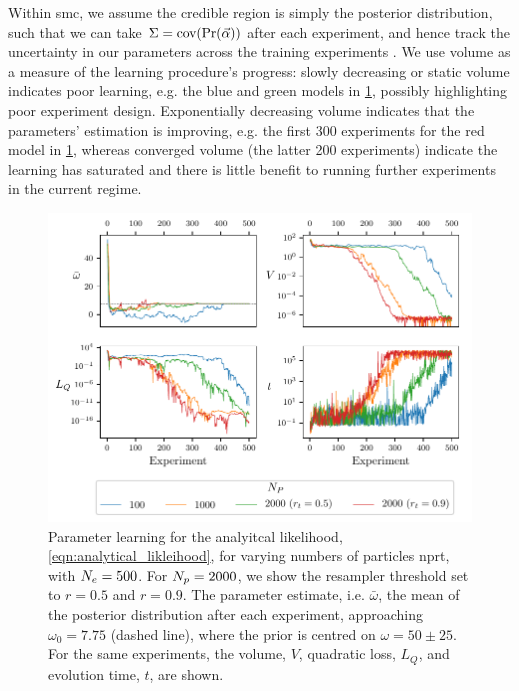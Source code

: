 Within \gls{smc}, we assume the credible region is simply the posterior distribution, 
    such that we can take $\Sigma = \textrm{cov}(\Pr(\vec{\alpha}))$ after each experiment, 
    and hence track the uncertainty in our parameters across the training \glspl{experiment} \cite{Granade:2012kj}.
We use \gls{volume} as a measure of the learning procedure's progress: 
    slowly decreasing or static \gls{volume} indicates poor learning, e.g. the blue and green models in \cref{fig:param_learning_vary_particles}, 
    possibly highlighting poor \gls{experiment} design.
Exponentially decreasing \gls{volume} indicates that the parameters' estimation is improving,
    e.g. the first 300 \glspl{experiment} for the red model in \cref{fig:param_learning_vary_particles},
    whereas converged \gls{volume} (the latter 200 \glspl{experiment})
    indicate the learning has saturated and there is little benefit to running further \glspl{experiment} 
    in the current regime. 

\begin{figure}[t]
    \centering
    \includegraphics{algorithms/figures/params.pdf}
    \caption[Parameter learning with varying number of particles]{
        Parameter learning for the analyitcal \gls{likelihood}, \cref{eqn:analytical_likleihood},
        for varying numbers of \glspl{particle} \gls{nprt}, with $N_e=500$. 
        For $N_p=2000$, we show the resampler threshold set to $r=0.5$ and $r=0.9$. 
        The parameter estimate, i.e. $\bar{\omega}$, the mean of the posterior distribution after each experiment, 
        approaching $\omega_0=7.75$ (dashed line), where the prior is centred on $\omega=50 \pm 25$. 
        For the same experiments, the volume, $V$, quadratic loss, $L_Q$, 
        and evolution time, $t$, are shown.
        \figtableref
    }
    \label{fig:param_learning_vary_particles}
\end{figure}


